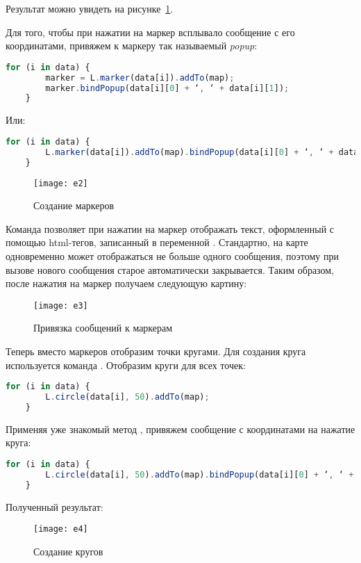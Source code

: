 Результат можно увидеть на рисунке~\ref{pic:e2}.

Для того, чтобы при нажатии на маркер всплывало сообщение с его координатами, 
привяжем к маркеру так называемый \emph{popup}:
\begin{lstlisting}[language=js]
    for (i in data) {
        marker = L.marker(data[i]).addTo(map);
        marker.bindPopup(data[i][0] + ‘, ‘ + data[i][1]);
    }
\end{lstlisting}
Или:
\begin{lstlisting}[language=js]
    for (i in data) {
        L.marker(data[i]).addTo(map).bindPopup(data[i][0] + ‘, ‘ + data[i][1]);
    }
\end{lstlisting}

\begin{figure}[h!]
    \center
    \texttt{[image: e2]}
    \caption{Создание маркеров}
    \label{pic:e2}
\end{figure}

Команда  позволяет при нажатии на маркер отображать 
текст, оформленный с помощью html-тегов, записанный в переменной 
. Стандартно, на карте одновременно может отображаться не 
больше одного сообщения, поэтому при вызове нового сообщения старое 
автоматически закрывается. Таким образом, после нажатия на маркер получаем 
следующую картину: 
\begin{figure}[ht!]
    \center
    \texttt{[image: e3]}
    \caption{Привязка сообщений к маркерам}
\end{figure}

Теперь вместо маркеров отобразим точки кругами. Для создания круга 
используется команда . Отобразим 
круги для всех точек:
\begin{lstlisting}[language=js]
    for (i in data) {
        L.circle(data[i], 50).addTo(map);
    }
\end{lstlisting}
Применяя уже знакомый метод , привяжем сообщение с 
координатами на нажатие круга:
\begin{lstlisting}[language=js]
    for (i in data) {
        L.circle(data[i], 50).addTo(map).bindPopup(data[i][0] + ‘, ‘ + data[i][1]);
    }
\end{lstlisting}

Полученный результат:
\begin{figure}[ht!]
    \center
    \texttt{[image: e4]}
    \caption{Создание кругов}
    \label{pic:e4}
\end{figure}

